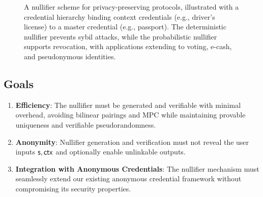 \begin{figure}
{
    }
    \caption[Nullifier Scheme]{A nullifier scheme for privacy-preserving protocols, illustrated with a credential hierarchy binding context credentials (e.g., driver's license) to a master credential (e.g., passport). The deterministic nullifier prevents sybil attacks, while the probabilistic nullifier supports revocation, with applications extending to voting, e-cash, and pseudonymous identities.}
    \label{fig:credential-nullifier-revised}
\end{figure}


\subsection{Goals}


\begin{enumerate}
    \item \textbf{Efficiency}: The nullifier must be generated and verifiable with minimal overhead, avoiding bilinear pairings and MPC while maintaining provable uniqueness and verifiable pseudorandomness.
    
    \item \textbf{Anonymity}: Nullifier generation and verification must not reveal the user inputs $\mathsf{s}, \mathsf{ctx}$ and optionally enable unlinkable outputs. 
    
    \item \textbf{Integration with Anonymous Credentials}: The nullifier mechanism must seamlessly extend our existing anonymous credential framework without compromising its security properties.
\end{enumerate}

